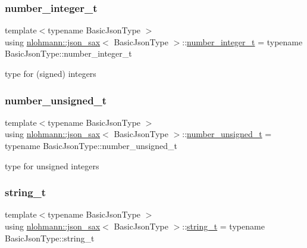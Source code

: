 \subsubsection{\texorpdfstring{number\+\_\+integer\+\_\+t}{number\_integer\_t}}
{\footnotesize\ttfamily template$<$typename Basic\+Json\+Type $>$ \\
using \hyperlink{structnlohmann_1_1json__sax}{nlohmann\+::json\+\_\+sax}$<$ Basic\+Json\+Type $>$\+::\hyperlink{structnlohmann_1_1json__sax_a0cef30121f02b7fee85e9708148ea0aa}{number\+\_\+integer\+\_\+t} =  typename Basic\+Json\+Type\+::number\+\_\+integer\+\_\+t}



type for (signed) integers 

\mbox{\label{structnlohmann_1_1json__sax_a32028cc056ae0f43aaae331cdbbbf856}} 
\subsubsection{\texorpdfstring{number\+\_\+unsigned\+\_\+t}{number\_unsigned\_t}}
{\footnotesize\ttfamily template$<$typename Basic\+Json\+Type $>$ \\
using \hyperlink{structnlohmann_1_1json__sax}{nlohmann\+::json\+\_\+sax}$<$ Basic\+Json\+Type $>$\+::\hyperlink{structnlohmann_1_1json__sax_a32028cc056ae0f43aaae331cdbbbf856}{number\+\_\+unsigned\+\_\+t} =  typename Basic\+Json\+Type\+::number\+\_\+unsigned\+\_\+t}



type for unsigned integers 

\mbox{\label{structnlohmann_1_1json__sax_ae01977a9f3c5b3667b7a2929ed91061e}} 
\subsubsection{\texorpdfstring{string\+\_\+t}{string\_t}}
{\footnotesize\ttfamily template$<$typename Basic\+Json\+Type $>$ \\
using \hyperlink{structnlohmann_1_1json__sax}{nlohmann\+::json\+\_\+sax}$<$ Basic\+Json\+Type $>$\+::\hyperlink{structnlohmann_1_1json__sax_ae01977a9f3c5b3667b7a2929ed91061e}{string\+\_\+t} =  typename Basic\+Json\+Type\+::string\+\_\+t}




